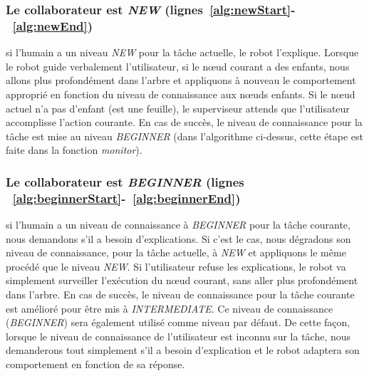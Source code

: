 \documentclass[a4paper,11pt,twoside]{StyleThese}
\begin{document}
\subsubsection{Le collaborateur est \textit{NEW} (lignes~\ref{alg:newStart}-~\ref{alg:newEnd})} si l'humain a un niveau \textit{NEW} pour la tâche actuelle, le robot l'explique.
Lorsque le robot guide verbalement l'utilisateur, si le nœud courant a des enfants, nous allons plus profondément dans l'arbre et appliquons à nouveau le comportement approprié en fonction du niveau de connaissance aux nœuds enfants. Si le nœud actuel n'a pas d'enfant (est une feuille), le superviseur attends que l'utilisateur accomplisse l'action courante. En cas de succès, le niveau de connaissance pour la tâche est mise au niveau \textit{BEGINNER} (dans l'algorithme ci-dessus, cette étape est faite dans la fonction \textit{monitor}).



\subsubsection{Le collaborateur est \textit{BEGINNER} (lignes ~\ref{alg:beginnerStart}-~\ref{alg:beginnerEnd})} si l'humain a un niveau de connaissance à \textit{BEGINNER} pour la tâche courante, nous demandons s'il a besoin d'explications. Si c'est le cas, nous dégradons son niveau de connaissance, pour la tâche actuelle, à \textit{NEW} et appliquons le même procédé que le niveau \textit{NEW}. Si l'utilisateur refuse les explications, le robot va simplement surveiller l'exécution du nœud courant, sans aller plus profondément dans l'arbre. En cas de succès, le niveau de connaissance pour la tâche courante est amélioré pour être mis à \textit{INTERMEDIATE}. Ce niveau de connaissance (\textit{BEGINNER}) sera également utilisé comme niveau par défaut. De cette façon, lorsque le niveau de connaissance de l'utilisateur est inconnu sur la tâche, nous demanderons tout simplement s'il a besoin d'explication et le robot adaptera son comportement en fonction de sa réponse.
\end{document}

